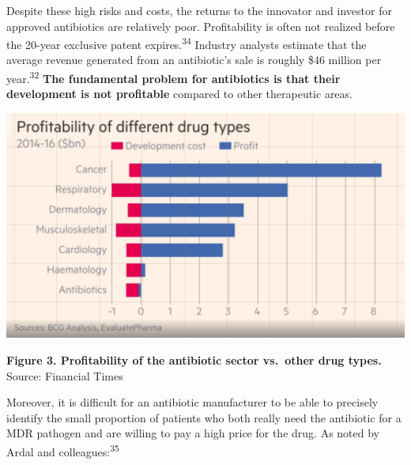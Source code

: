 \documentclass[
  11pt,
  paper=a4,
  ,captions=tableheading
]{scrartcl}
\begin{document}
Despite these high risks and costs, the returns to the innovator and
investor for approved antibiotics are relatively poor. Profitability is
often not realized before the 20-year exclusive patent
expires.\textsuperscript{34} Industry analysts estimate that the average
revenue generated from an antibiotic's sale is roughly \$46 million per
year.\textsuperscript{32} \textbf{The fundamental problem for
antibiotics is that their development is not profitable} compared to
other therapeutic areas.

\includegraphics[width=6.25in,height=\textheight]{images/antibioticprofit.png}

\textbf{Figure 3. Profitability of the antibiotic sector vs.~other drug
types.} Source: Financial Times

Moreover, it is difficult for an antibiotic manufacturer to be able to
precisely identify the small proportion of patients who both really need
the antibiotic for a MDR pathogen and are willing to pay a high price
for the drug. As noted by Ardal and colleagues:\textsuperscript{35}
\end{document}
